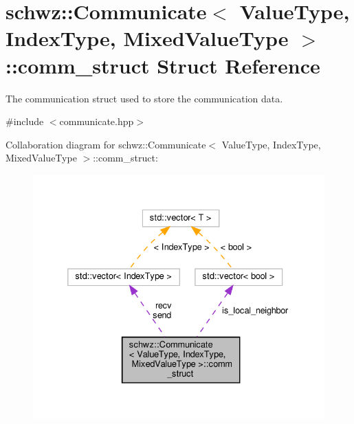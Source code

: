 \hypertarget{structschwz_1_1Communicate_1_1comm__struct}{}\section{schwz\+:\+:Communicate$<$ Value\+Type, Index\+Type, Mixed\+Value\+Type $>$\+:\+:comm\+\_\+struct Struct Reference}
\label{structschwz_1_1Communicate_1_1comm__struct}


The communication struct used to store the communication data.  




{\ttfamily \#include $<$communicate.\+hpp$>$}



Collaboration diagram for schwz\+:\+:Communicate$<$ Value\+Type, Index\+Type, Mixed\+Value\+Type $>$\+:\+:comm\+\_\+struct\+:
\nopagebreak
\begin{figure}[H]
\begin{center}
\leavevmode
\includegraphics[width=332pt]{structschwz_1_1Communicate_1_1comm__struct__coll__graph}
\end{center}
\end{figure}
